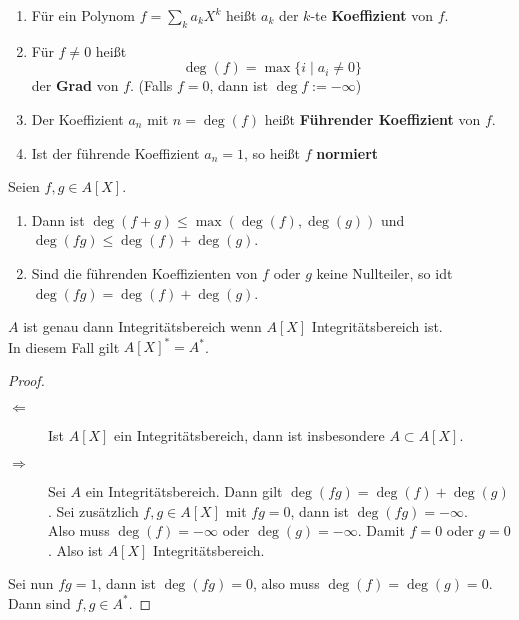 	\begin{definition}
		\begin{enumerate}
			\item Für ein Polynom $f=\sum_ka_kX^k$ heißt $a_k$ der $k$-te \textbf{Koeffizient} von $f$.
			\item Für $f\neq0$ heißt
			\[\deg(f)=\max\{i\mid a_i\neq 0\}\]
			der \textbf{Grad} von $f$. (Falls $f=0$, dann ist $\deg f:=-\infty$)
			\item Der Koeffizient $a_n$ mit $n=\deg(f)$ heißt \textbf{Führender Koeffizient} von $f$.
			\item Ist der führende Koeffizient $a_n=1$, so heißt $f$ \textbf{normiert}
		\end{enumerate}
	\end{definition}

	\begin{theorem}
		Seien $f,g\in A[X]$. \begin{enumerate}
			\item Dann ist $\deg(f+g)\leq\max(\deg (f),\deg (g))$ und $\deg(fg)\leq\deg(f)+\deg(g)$.\\
			\item Sind die führenden Koeffizienten von $f$ oder $g$ keine Nullteiler, so idt $\deg(fg)=\deg(f)+\deg (g)$.
		\end{enumerate}
	\end{theorem}

	\begin{kor}\label{kor:IBPily1V}
		$A$ ist genau dann Integritätsbereich wenn $A[X]$ Integritätsbereich ist.\\
		In diesem Fall gilt $A[X]^*=A^*$.
	\end{kor}
	\begin{proof}
		\begin{description}
			\item[$\Leftarrow$] Ist $A[X]$ ein Integritätsbereich, dann ist insbesondere $A\subset A[X]$.
			\item[$\Rightarrow$] Sei $A$ ein Integritätsbereich. Dann gilt $\deg(fg)=\deg(f)+\deg(g)$. Sei zusätzlich $f,g\in A[X]$ mit $fg=0$, dann ist $\deg(fg)=-\infty$.\\
			Also muss $\deg(f)=-\infty$ oder $\deg(g)=-\infty$. Damit $f=0$ oder $g=0$. Also ist $A[X]$ Integritätsbereich.
		\end{description}
		Sei nun $fg=1$, dann ist $\deg(fg)=0$, also muss $\deg(f)=\deg(g)=0$. Dann sind $f,g\in A^*$.
	\end{proof}

